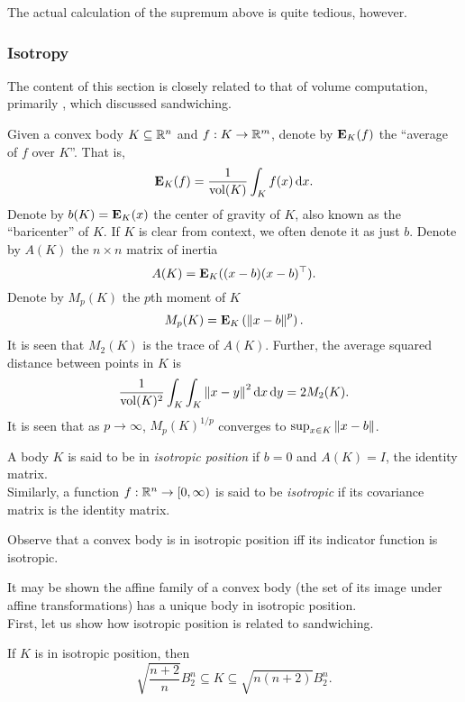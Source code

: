 The actual calculation of the supremum above is quite tedious, however.


\subsubsection{Isotropy}

The content of this section is closely related to that of volume computation, primarily , which discussed sandwiching.

Given a convex body $K\subseteq\mathbb{R}^n$ and $f:K\to\mathbb{R}^m$, denote by $\textbf{E}_K(f)$ the ``average of $f$ over $K$''. That is,
\[ \textbf{E}_K(f) = \frac{1}{\operatorname{vol}(K)} \int_{K} f(x)\operatorname{d}\!{x}. \]
Denote by $b(K)=\textbf{E}_K(x)$ the center of gravity of $K$, also known as the ``baricenter'' of $K$. If $K$ is clear from context, we often denote it as just $b$. Denote by $A(K)$ the $n\times n$ matrix of inertia
\[ A(K) = \textbf{E}_K((x-b)(x-b)^\top). \]
Denote by $M_p(K)$ the $p$th moment of $K$
\[ M_p(K) = \textbf{E}_K\left(\left\lVert x-b\right\rVert^p\right). \]
It is seen that $M_2(K)$ is the trace of $A(K)$. Further, the average squared distance between points in $K$ is
\[ \frac{1}{\operatorname{vol}(K)^2} \int_K \int_K \left\lVert x-y\right\rVert^2\operatorname{d}\!{x}\operatorname{d}\!{y} = 2M_2(K). \]
It is seen that as $p\to\infty$, $M_p(K)^{1/p}$ converges to $\sup_{x\in K} \left\lVert x-b\right\rVert$.

\begin{fdef}[Isotropic]
	A body $K$ is said to be in \textit{isotropic position} if $b=0$ and $A(K)=I$, the identity matrix.\footnotemark\\
	Similarly, a function $f:\mathbb{R}^n\to[0,\infty)$ is said to be \textit{isotropic} if its covariance matrix is the identity matrix.
\end{fdef}

Observe that a convex body is in isotropic position iff its indicator function is isotropic.

It may be shown the affine family of a convex body (the set of its image under affine transformations) has a unique body in isotropic position.\\
First, let us show how isotropic position is related to sandwiching.

\begin{ftheo}
	If $K$ is in isotropic position, then
	\[ \sqrt{\frac{n+2}{n}} B_2^n \subseteq K \subseteq \sqrt{n(n+2)}B_2^n. \]
\end{ftheo}

